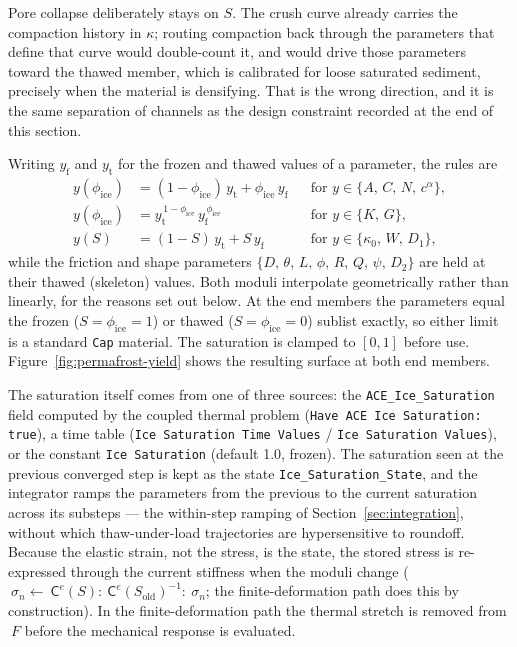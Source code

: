 \documentclass[12pt]{article}
\newcommand{\stress}{~\sigma}
\newcommand{\Fdef}{~F}
\newcommand{\Celast}{{~{\mathsf C}^e}}
\begin{document}
Pore collapse deliberately stays on $S$. The crush curve already
carries the compaction history in $\kappa$; routing compaction back
through the parameters that define that curve would double-count it,
and would drive those parameters toward the thawed member, which is
calibrated for loose saturated sediment, precisely when the material
is densifying. That is the wrong direction, and it is the same
separation of channels as the design constraint recorded at the end
of this section.

Writing $y_{\mathrm f}$ and $y_{\mathrm t}$ for the frozen and thawed
values of a parameter, the rules are
\begin{equation}
  \begin{aligned}
    y(\phi_{\mathrm{ice}}) &= (1-\phi_{\mathrm{ice}})\,y_{\mathrm t}
      + \phi_{\mathrm{ice}}\,y_{\mathrm f}
      && \text{for } y \in \{A,\,C,\,N,\,c^\alpha\},
    \\
    y(\phi_{\mathrm{ice}}) &= y_{\mathrm t}^{\,1-\phi_{\mathrm{ice}}}\,
      y_{\mathrm f}^{\,\phi_{\mathrm{ice}}}
      && \text{for } y \in \{K,\,G\},
    \\
    y(S) &= (1-S)\,y_{\mathrm t} + S\,y_{\mathrm f}
      && \text{for } y \in \{\kappa_0,\,W,\,D_1\},
  \end{aligned}
  \label{eq:satmap}
\end{equation}
while the friction and shape parameters
$\{D,\,\theta,\,L,\,\phi,\,R,\,Q,\,\psi,\,D_2\}$ are held at their
thawed (skeleton) values. Both moduli interpolate geometrically
rather than linearly, for the reasons set out below. At the end
members the parameters equal the frozen
($S = \phi_{\mathrm{ice}} = 1$) or thawed
($S = \phi_{\mathrm{ice}} = 0$) sublist exactly, so either limit is a
standard \texttt{Cap} material. The saturation is clamped to $[0, 1]$
before use. Figure~\ref{fig:permafrost-yield} shows the resulting
surface at both end members.

The saturation itself comes from one of three sources: the
\texttt{ACE\_Ice\_Saturation} field computed by the coupled thermal
problem (\texttt{Have ACE Ice Saturation: true}), a time table
(\texttt{Ice Saturation Time Values} / \texttt{Ice Saturation
Values}), or the constant \texttt{Ice Saturation} (default 1.0,
frozen). The saturation seen at the previous converged step is kept
as the state \texttt{Ice\_Saturation\_State}, and the integrator
ramps the parameters from the previous to the current saturation
across its substeps --- the within-step ramping of
Section~\ref{sec:integration}, without which thaw-under-load
trajectories are hypersensitive to roundoff. Because the elastic
strain, not the stress, is the state, the stored stress is
re-expressed through the current stiffness when the moduli change
($\stress_n \leftarrow \Celast(S) : \Celast(S_{\mathrm{old}})^{-1}
: \stress_n$; the finite-deformation path does this by construction).
In the finite-deformation path the thermal stretch is removed from
$\Fdef$ before the mechanical response is evaluated.
\end{document}
